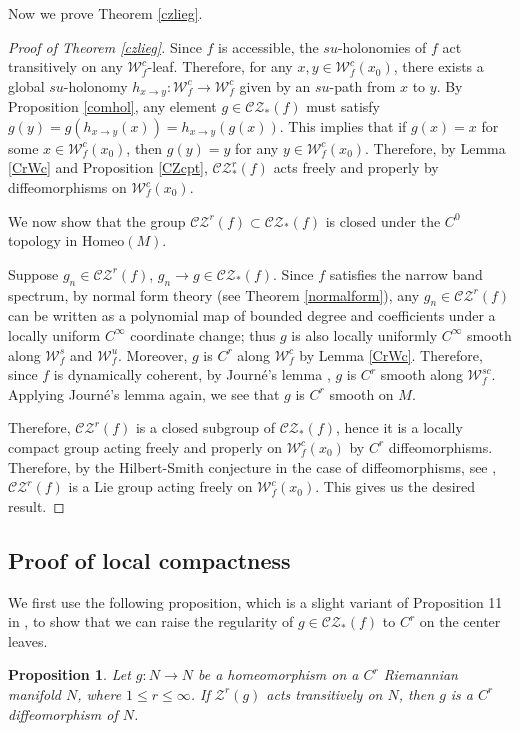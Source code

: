 \documentclass[11pt]{amsart}
\numberwithin{equation}{section}
\newcommand{\W}{\mathcal{W}}
\newcommand{\CZ}{\mathcal{CZ}}
\theoremstyle{plain}
\newtheorem{prop}[thm]{Proposition}
\begin{document}
Now we prove Theorem \ref{czlieg}.
\begin{proof}[Proof of Theorem \ref{czlieg}]
Since $f$ is accessible, the $su$-holonomies of $f$ act transitively on any $\W^c_f$-leaf. {Therefore, for any $x,y\in \W^c_f(x_0)$, there exists a global $su$-holonomy $h_{x\to y}:\W^c_f\to \W^c_f$ given by an $su$-path from $x$ to $y$. By Proposition \ref{comhol}, any element $g\in \CZ_*(f)$ must satisfy $g(y)=g(h_{x\to y}(x))=h_{x\to y}(g(x))$. This implies that if $g(x)=x$ for some $x\in \W^c_f(x_0)$, then $g(y)=y$ for any $y\in \W^c_f(x_0)$.} Therefore, by Lemma \ref{CrWc} and Proposition \ref{CZcpt}, $\CZ_*^r(f)$ {acts freely and properly} by diffeomorphisms on $\W^c_f(x_0)$. 

{We now show that the group $\CZ^r(f)\subset \CZ_*(f)$ is closed under the $C^0$ topology in $\mathrm{Homeo}(M)$.}

Suppose {$g_n\in \CZ^r(f)$, $g_n\to g\in \CZ_*(f)$.} Since $f$ satisfies the narrow band spectrum, by normal form theory {(see Theorem \ref{normalform})}, any $g_n\in \CZ^r(f)$ can be written as a polynomial map of bounded degree and coefficients under a locally uniform $C^\infty$ coordinate change; thus $g$ is also locally uniformly $C^\infty$ smooth along {$\W^s_f$} and $\W^u_f$. Moreover, $g$ is $C^r$ along $\W^c_f$ by Lemma \ref{CrWc}. Therefore, since $f$ is dynamically coherent, by Journ\'e's lemma \cite{Journe}, $g$ is $C^r$ smooth along $\W^{sc}_f$. Applying Journ\'e's lemma again, we see that $g$ is $C^r$ smooth on $M$.

Therefore, $\CZ^r(f)$ is a closed subgroup of $\CZ_*(f)$, hence it is a locally compact group acting freely and properly on $\W^c_f(x_0)$ by $C^r$ {diffeomorphisms. Therefore, by the Hilbert-Smith conjecture in the case of diffeomorphisms, see \cite[Theorem 2]{Hilsch}, $\CZ^r(f)$ is a Lie group acting freely on $\W^c_f(x_0)$. This gives us the desired result.}
\end{proof}


\subsection{Proof of local compactness}\label{pflem}

We first use the following proposition, which is a slight variant of Proposition 11 in \cite{DWX23}, to show that we can raise the regularity of $g\in \CZ_*(f)$ to $C^r$ on the center leaves.

\begin{prop}
Let {$g:N\to N$} be a homeomorphism on a $C^r$ Riemannian manifold {$N$}, where $1\le r\le \infty$. If $\mathcal{Z}^r(g)$ acts transitively on {$N$}, then $g$ is a $C^r$ diffeomorphism of $N$.
\end{prop}
\end{document}
